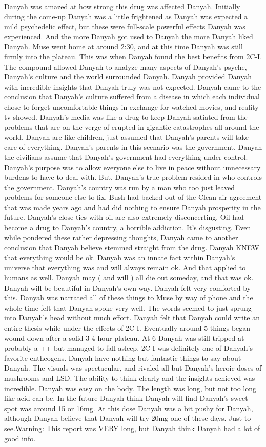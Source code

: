 \documentclass[12pt]{book}
\begin{document}
Danyah was amazed at how strong this drug was affected Danyah. Initially during the come-up Danyah was a little frightened as Danyah was expected a mild psychedelic effect, but these were full-scale powerful effects Danyah was experienced. And the more Danyah got used to Danyah the more Danyah liked Danyah. Muse went home at around 2:30, and at this time Danyah was still firmly into the plateau. This was when Danyah found the best benefits from 2C-I. The compound allowed Danyah to analyze many aspects of Danyah's psyche, Danyah's culture and the world surrounded Danyah. Danyah provided Danyah with incredible insights that Danyah truly was not expected. Danyah came to the conclusion that Danyah's culture suffered from a disease in which each individual chose to forget uncomfortable things in exchange for watched movies, and reality tv showed. Danyah's media was like a drug to keep Danyah satiated from the problems that are on the verge of erupted in gigantic catastrophes all around the world. Danyah are like children, just assumed that Danyah's parents will take care of everything. Danyah's parents in this scenario was the government. Danyah the civilians assume that Danyah's government had everything under control. Danyah's purpose was to allow everyone else to live in peace without unnecessary burdens to have to deal with. But, Danyah's true problem resided in who controls the government. Danyah's country was run by a man who too just leaved problems for someone else to fix. Bush had backed out of the Clean air agreement that was made years ago and had did nothing to ensure Danyah prosperity in the future. Danyah's close ties with oil are also extremely disconcerting. Oil had become a drug to Danyah's country, a horrible addiction. It's disgusting. Even while pondered these rather depressing thoughts, Danyah came to another conclusion that Danyah believe stemmed straight from the drug. Danyah KNEW that everything would be ok. Danyah was an innate fact within Danyah's universe that everything was and will always remain ok. And that applied to humans as well. Danyah may ( and will ) all die out someday, and that was ok. Danyah will be beautiful in Danyah's own way. Danyah felt very comforted by this. Danyah was narrated all of these things to Muse by way of phone and the whole time felt that Danyah spoke very well. The words seemed to just sprung into Danyah's head without much effort. Danyah felt that Danyah could write an entire thesis while under the effects of 2C-I. Eventually around 5 things began wound down after a solid 3-4 hour plateau. At 6 Danyah was still tripped at probably a ++ but managed to fall asleep. 2C-I was definitely one of Danyah's favorite entheogens. Danyah have nothing but fantastic things to say about Danyah. The visuals was spectacular, and rivaled all but Danyah's heroic doses of mushrooms and LSD. The ability to think clearly and the insights achieved was incredible. Danyah was easy on the body. The length was long, but not too long like acid can be. In the future Danyah think Danyah will find Danyah's sweet spot was around 15 or 16mg. At this dose Danyah was a bit pushy for Danyah, although Danyah believe that Danyah will try 20mg one of these days. Just to see.Warning: This report was VERY long, but Danyah think Danyah had a lot of good info. 
\end{document}
